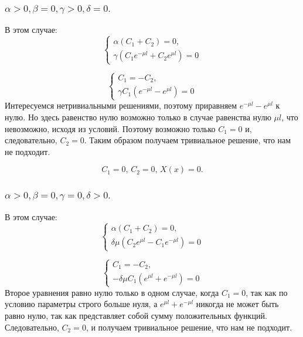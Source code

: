 \documentclass[12pt, a4paper]{article}
\begin{document}
\subsubsection{ $ \alpha > 0, \beta = 0, \gamma > 0, \delta = 0. $}
В этом случае:
\begin{displaymath}
	\begin{cases}
		\alpha (C_{1} + C_{2}) = 0, \\
		\gamma (C_{1} e^{-\mu l} + C_{2} e^{\mu l}) = 0
	\end{cases}
\end{displaymath}

\begin{displaymath}
	\begin{cases}
		C_{1} = - C_{2}, \\
		\gamma C_{1}(e^{-\mu l} - e^{\mu l}) = 0
	\end{cases}
\end{displaymath}
Интересуемся нетривиальными решениями, поэтому приравняем $e^{-\mu l} - e^{\mu l}$ к нулю. Но здесь равенство нулю возможно только в случае равенства нулю $\mu l$, что невозможно, исходя из условий. Поэтому возможно только $C_{1} = 0$ и, следовательно, $C_{2} = 0$. Таким образом получаем тривиальное решение, что нам не подходит.

\[ C_{1} = 0, \, C_{2} = 0, \, X(x) = 0. \]

\subsubsection{ $ \alpha > 0, \beta = 0, \gamma = 0, \delta > 0. $}
В этом случае:
\begin{displaymath}
	\begin{cases}
		\alpha (C_{1} + C_{2}) = 0, \\
		\delta \mu (C_{2} e^{\mu l} - C_{1} e^{-\mu l}) = 0
	\end{cases}
\end{displaymath}

\begin{displaymath}
	\begin{cases}
		C_{1} = - C_{2}, \\
		-\delta \mu C_{1} (e^{\mu l} + e^{-\mu l}) = 0
	\end{cases}
\end{displaymath}
Второе уравнения равно нулю только в одном случае, когда $C_{1} = 0$, так как по условию параметры строго больше нуля, а $e^{\mu l} + e^{-\mu l}$ никогда не может быть равно нулю, так как представляет собой сумму положительных функций. Следовательно, $C_{2} = 0$, и получаем тривиальное решение, что нам не подходит.
\end{document}
